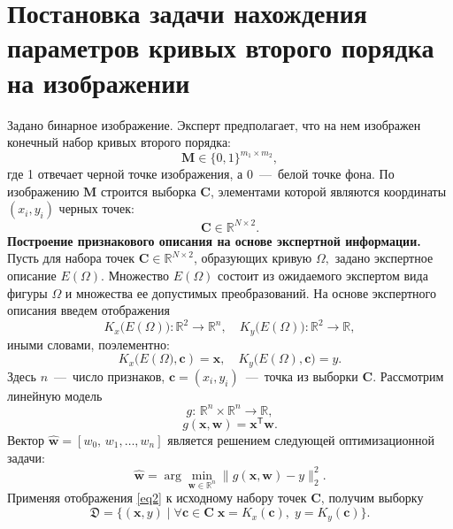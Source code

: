 \documentclass[12pt, twoside]{article}
\numberwithin{equation}{section}
\begin{document}
\section{Постановка задачи нахождения параметров кривых второго порядка на изображении}
Задано бинарное изображение. Эксперт предполагает, что на нем изображен конечный набор кривых второго порядка: $$ \mathbf{M} \in \{0, 1 \}^{m_1\times m_2},$$
где 1 отвечает черной точке изображения, а 0~---~белой точке фона. По изображению $\mathbf{M}$ строится выборка $\mathbf{C}$, элементами которой являются координаты $(x_i, y_i)$ черных точек: $$\mathbf{C} \in \mathbb{R}^{N \times 2}.$$
\textbf{Построение признакового описания на основе экспертной информации.} Пусть для набора точек $\mathbf{C} \in \mathbb{R}^{N \times 2}$, образующих кривую $\Omega, $ задано экспертное описание $E(\Omega)$. Множество $E(\Omega)$ состоит из ожидаемого экспертом вида фигуры $\Omega$ и множества ее допустимых преобразований. На основе экспертного описания введем отображения 
\begin{equation}\label{eq1}
K_{x}\bigl(E(\Omega)\bigr): \mathbb{R}^{2} \rightarrow \mathbb{R}^{n}, \quad K_{y}\bigl(E(\Omega)\bigr): \mathbb{R}^{2} \rightarrow \mathbb{R},
\end{equation} 
иными словами, поэлементно:
\begin{equation}\label{eq2}
K_{x}\bigl(E(\Omega\bigr), \mathbf{c}) = \mathbf{x}, \quad  K_{y}\bigl(E(\Omega), \mathbf{c}\bigr) = y
.\end{equation} 
Здесь $n$~---~число признаков, $\mathbf{c} = (x_i, y_i)$~---~точка из выборки $\mathbf{C}$. Рассмотрим линейную модель
\begin{equation}
g: \, \mathbb{R}^n \times \mathbb{R}^n \rightarrow \mathbb{R},
\end{equation}
\begin{equation}\label{eq3}
g(\mathbf{x}, \mathbf{w}) = \mathbf{x}^\mathsf{T} \mathbf{w}.
\end{equation}
Вектор $\hat{\mathbf{w}}= [w_0, \, w_1, \dots, w_n]$ является решением следующей оптимизационной задачи:  \begin{equation}
\hat{\mathbf{w}} = \arg\min_{\mathbf{w}\in\mathbb{R}^n} \|g(\mathbf{x}, \mathbf{w}) - y \|_2^2.
\end{equation} 
Применяя отображения \eqref{eq2} к исходному набору точек $\mathbf{C}$, получим выборку 
\begin{equation}\label{eq4}
    \mathfrak{D} = \{(\mathbf{x}, y) \; | \; \forall \mathbf{c} \in \mathbf{C} \; \mathbf{x} = K_x(\mathbf{c}), \; y = K_y(\mathbf{c}) \}.
    \end{equation} 
\end{document}
